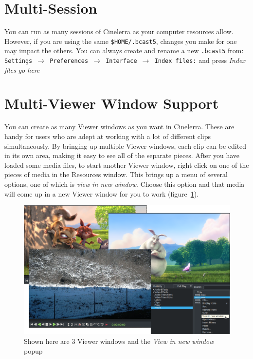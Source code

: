 \section{Multi-Session}%
\label{sec:multi_session}

You can run as many sessions of Cinelerra as your computer resources allow.  However, if you are using the same \texttt{\$HOME/.bcast5}, changes you make for one may impact the others. You can always create and rename a new \texttt{.bcast5} from:\\
\texttt{Settings $\rightarrow$ Preferences $\rightarrow$ Interface $\rightarrow$ Index files:} and press \textit{Index files go here}

\section{Multi-Viewer Window Support}%
\label{sec:multi_viewer_window_support}

You can create as many Viewer windows as you want in Cinelerra.  These are handy for users who are adept at working with a lot of different clips simultaneously.  By bringing up multiple Viewer windows, each clip can be edited in its own area, making it easy to see all of the separate pieces.  After you have loaded some media files, to start another Viewer window, right click on one of the pieces of media in the Resources window.  This brings up a menu of several options, one of which is \textit{view in new window}.  Choose this option and that media will come up in a new Viewer window for you to work (figure~\ref{fig:multi-view01}).

\begin{figure}[htpb]
    \centering
    \includegraphics[width=0.9\linewidth]{images/multi-view01.png}
    \caption{Shown here are 3 Viewer windows and the \textit{View in new window} popup}
    \label{fig:multi-view01}
\end{figure}

